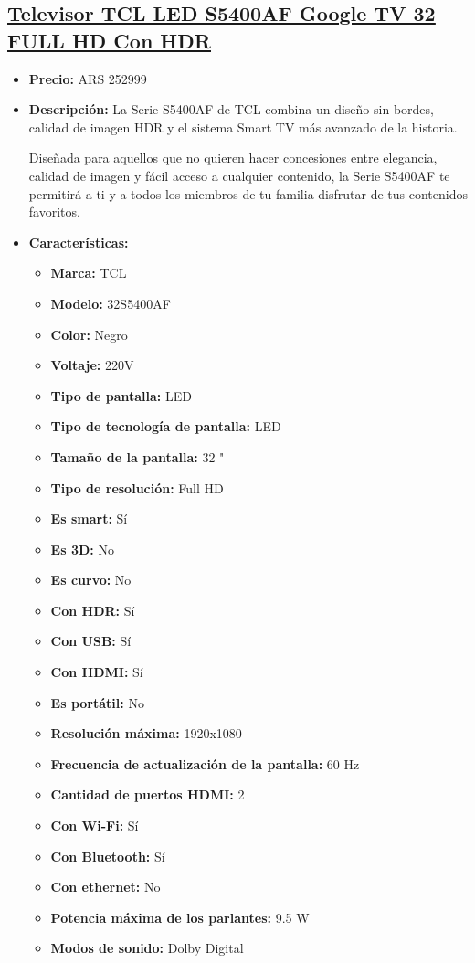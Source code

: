 \documentclass{article}
\begin{document}
\begin{adjustwidth}{2em}{}

\subsection{\uline{\href{https://www.mercadolibre.com.ar/televisor-tcl-led-s5400af-google-tv-32-full-hd-con-hdr/p/MLA27649309}{Televisor TCL LED S5400AF Google TV 32 FULL HD Con HDR}}}
\begin{itemize}
    \item \textbf{Precio:} ARS 252999
    \item \textbf{Descripción:} La Serie S5400AF de TCL combina un diseño sin bordes, calidad de imagen HDR y el sistema Smart TV más avanzado de la historia.

Diseñada para aquellos que no quieren hacer concesiones entre elegancia, calidad de imagen y fácil acceso a cualquier contenido, la Serie S5400AF te permitirá a ti y a todos los miembros de tu familia disfrutar de tus contenidos favoritos.
    \item \textbf{Características:} 
    \begin{itemize}
        \item \textbf {Marca:} TCL
    \item \textbf {Modelo:} 32S5400AF
    \item \textbf {Color:} Negro
    \item \textbf {Voltaje:} 220V
    \item \textbf {Tipo de pantalla:} LED
    \item \textbf {Tipo de tecnología de pantalla:} LED
    \item \textbf {Tamaño de la pantalla:} 32 "
    \item \textbf {Tipo de resolución:} Full HD
    \item \textbf {Es smart:} Sí
    \item \textbf {Es 3D:} No
    \item \textbf {Es curvo:} No
    \item \textbf {Con HDR:} Sí
    \item \textbf {Con USB:} Sí
    \item \textbf {Con HDMI:} Sí
    \item \textbf {Es portátil:} No
    \item \textbf {Resolución máxima:} 1920x1080
    \item \textbf {Frecuencia de actualización de la pantalla:} 60 Hz
    \item \textbf {Cantidad de puertos HDMI:} 2
    \item \textbf {Con Wi-Fi:} Sí
    \item \textbf {Con Bluetooth:} Sí
    \item \textbf {Con ethernet:} No
    \item \textbf {Potencia máxima de los parlantes:} 9.5 W
    \item \textbf {Modos de sonido:} Dolby Digital
    \end{itemize}
\end{itemize}


\end{adjustwidth}
\end{document}

